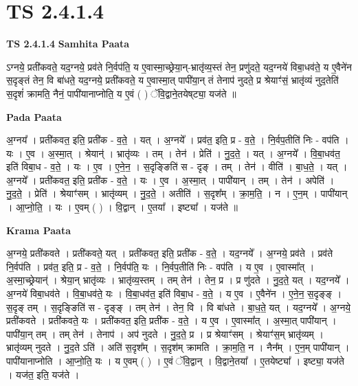 \documentclass[17pt]{extarticle}
\begin{document}
\section{ TS 2.4.1.4 }

\textbf{TS 2.4.1.4 } \newline
\textbf{Samhita Paata} \newline

ऽग्नये॒ प्रती॑कवते॒ यद॒ग्नये॒ प्रव॑ते नि॒र्वप॑ति॒ य ए॒वास्मा॒च्छ्रेया॒न्-भ्रातृ॑व्य॒स्तं तेन॒ प्रणु॑दते॒ यद॒ग्नये॑ विबा॒धव॑ते॒ य ए॒वैने॑न स॒दृङ्तं तेन॒ वि बा॑धते॒ यद॒ग्नये॒ प्रती॑कवते॒ य ए॒वास्मा॒त् पापी॑या॒न् तं तेनाप॑ नुदते॒ प्र श्रेयाꣳ॑सं॒ भ्रातृ॑व्यं नुद॒तेति॑ स॒दृशं॑ क्रामति॒ नैनं॒ पापी॑यानाप्नोति॒ य ए॒वं ( ) ॅवि॒द्वाने॒तयेष्‌ट्या॒ यज॑ते ॥ \newline

\textbf{Pada Paata} \newline

अ॒ग्नय᳚ । प्रती॑कवत॒ इति॒ प्रती॑क - व॒ते॒ । यत् । अ॒ग्नये᳚ । प्रव॑त॒ इति॒ प्र - व॒ते॒ । नि॒र्वप॒तीति॑ निः - वप॑ति । यः । ए॒व । अ॒स्मा॒त् । श्रेयान्॑ । भ्रातृ॑व्यः । तम् । तेन॑ । प्रेति॑ । नु॒द॒ते॒ । यत् । अ॒ग्नये᳚ । वि॒बा॒धव॑त॒ इति॑ विबा॒ध - व॒ते॒ । यः । ए॒व । ए॒ने॒न॒ । स॒दृङ्ङिति॑ स - दृङ् । तम् । तेन॑ । वीति॑ । बा॒ध॒ते॒ । यत् । अ॒ग्नये᳚ । प्रती॑कवत॒ इति॒ प्रती॑क - व॒ते॒ । यः । ए॒व । अ॒स्मा॒त् । पापी॑यान् । तम् । तेन॑ । अपेति॑ । नु॒द॒ते॒ । प्रेति॑ । श्रेयाꣳ॑सम् । भ्रातृ॑व्यम् । नु॒द॒ते॒ । अतीति॑ । स॒दृश᳚म् । क्रा॒म॒ति॒ । न । ए॒न॒म् । पापी॑यान् । आ॒प्नो॒ति॒ । यः । ए॒वम् ( ) । वि॒द्वान् । ए॒तया᳚ । इष्ट्या᳚ । यज॑ते ॥  \newline


\textbf{Krama Paata} \newline

अ॒ग्नये॒ प्रती॑कवते । प्रती॑कवते॒ यत् । प्रती॑कवत॒ इति॒ प्रती॑क - व॒ते॒ । यद॒ग्नये᳚ । अ॒ग्नये॒ प्रव॑ते । प्रव॑ते नि॒र्वप॑ति । प्रव॑त॒ इति॒ प्र - व॒ते॒ । नि॒र्वप॑ति॒ यः । नि॒र्वप॒तीति॑ निः - वप॑ति । य ए॒व । ए॒वास्मा᳚त् । अ॒स्मा॒च्छ्रेयान्॑ । श्रेया॒न् भ्रातृ॑व्यः । भ्रातृ॑व्य॒स्तम् । तम् तेन॑ । तेन॒ प्र । प्र णु॑दते । नु॒द॒ते॒ यत् । यद॒ग्नये᳚ । अ॒ग्नये॑ विबा॒धव॑ते । वि॒बा॒धव॑ते॒ यः । वि॒बा॒धव॑त॒ इति॑ विबा॒ध - 
व॒ते॒ । य ए॒व । ए॒वैने॑न । ए॒ने॒न॒ स॒दृङ्ङ् । स॒दृङ् तम् । स॒दृङ्ङिति॑ स - दृङ्ङ् । तम् तेन॑ । तेन॒ वि । वि बा॑धते । बा॒ध॒ते॒ यत् । यद॒ग्नये᳚ । अ॒ग्नये॒ प्रती॑कवते । प्रती॑कवते॒ यः । प्रती॑कवत॒ इति॒ प्रती॑क - व॒ते॒ । य ए॒व । ए॒वास्मा᳚त् । अ॒स्मा॒त् पापी॑यान् । पापी॑या॒न् तम् । तम् तेन॑ । तेनाप॑ । अप॑ नुदते । नु॒द॒ते॒ प्र । प्र श्रेयाꣳ॑सम् । श्रेयाꣳ॑स॒म् भ्रातृ॑व्यम् । भ्रातृ॑व्यम् नुदते । नु॒द॒ते ऽति॑ । अति॑ स॒दृश᳚म् । स॒दृश॑म् क्रामति । क्रा॒म॒ति॒ न । नैन᳚म् । ए॒न॒म् पापी॑यान् । पापी॑यानाप्नोति । आ॒प्नो॒ति॒ यः । य ए॒वम् ( ) । ए॒वं ॅवि॒द्वान् । वि॒द्वाने॒तया᳚ । ए॒तयेष्ट्या᳚ । इष्ट्या॒ यज॑ते । यज॑त॒ इति॒ यज॑ते । \newline
\end{document}
